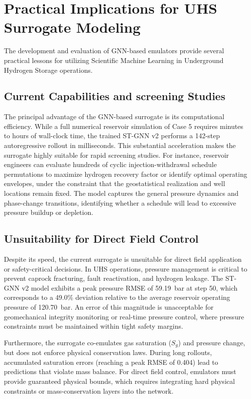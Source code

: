 \documentclass[10pt,twocolumn]{article}
\begin{document}
\section{Practical Implications for UHS Surrogate Modeling}
The development and evaluation of GNN-based emulators provide several practical lessons for utilizing Scientific Machine Learning in Underground Hydrogen Storage operations.

\subsection{Current Capabilities and screening Studies}
The principal advantage of the GNN-based surrogate is its computational efficiency. While a full numerical reservoir simulation of Case 5 requires minutes to hours of wall-clock time, the trained ST-GNN v2 performs a 142-step autoregressive rollout in milliseconds. This substantial acceleration makes the surrogate highly suitable for rapid screening studies. For instance, reservoir engineers can evaluate hundreds of cyclic injection-withdrawal schedule permutations to maximize hydrogen recovery factor or identify optimal operating envelopes, under the constraint that the geostatistical realization and well locations remain fixed. The model captures the general pressure dynamics and phase-change transitions, identifying whether a schedule will lead to excessive pressure buildup or depletion.

\subsection{Unsuitability for Direct Field Control}
Despite its speed, the current surrogate is unsuitable for direct field application or safety-critical decisions. In UHS operations, pressure management is critical to prevent caprock fracturing, fault reactivation, and hydrogen leakage. The ST-GNN v2 model exhibits a peak pressure RMSE of 59.19~bar at step 50, which corresponds to a 49.0\% deviation relative to the average reservoir operating pressure of 120.70~bar. An error of this magnitude is unacceptable for geomechanical integrity monitoring or real-time pressure control, where pressure constraints must be maintained within tight safety margins.

Furthermore, the surrogate co-emulates gas saturation ($S_g$) and pressure change, but does not enforce physical conservation laws. During long rollouts, accumulated saturation errors (reaching a peak RMSE of 0.404) lead to predictions that violate mass balance. For direct field control, emulators must provide guaranteed physical bounds, which requires integrating hard physical constraints or mass-conservation layers into the network.
\end{document}

